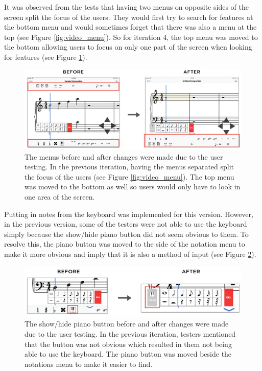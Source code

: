 				It was observed from the tests that having two menus on opposite sides of the screen split the focus of the users. They would first try to search for features at the bottom menu and would sometimes forget that there was also a menu at the top (see Figure \ref{fig:video_menu}). So for iteration 4, the top menu was moved to the bottom allowing users to focus on only one part of the screen when looking for features (see Figure \ref{fig:before-after-menu}). 

				\begin{figure}[h]
					\centering
					\includegraphics[scale=0.31]{figures/before-after-menu}
				    \caption{The menus before and after changes were made due to the user testing. In the previous iteration, having the menus separated split the focus of the users (see Figure \ref{fig:video_menu}). The top menu was moved to the bottom as well so users would only have to look in one area of the screen.}
				    \label{fig:before-after-menu}
				\end{figure}

				Putting in notes from the keyboard was implemented for this version. However, in the previous version, some of the testers were not able to use the keyboard simply because the show/hide piano button did not seem obvious to them. To resolve this, the piano button was moved to the side of the notation menu to make it more obvious and imply that it is also a method of input (see Figure \ref{fig:before-after-pianobtn}). 

				\begin{figure}[h]
					\centering
					\includegraphics[scale=0.31]{figures/before-after-pianobtn.png}
				    \caption{The show/hide piano button before and after changes were made due to the user testing. In the previous iteration, testers mentioned that the button was not obvious which resulted in them not being able to use the keyboard. The piano button was moved beside the notations menu to make it easier to find.}
				    \label{fig:before-after-pianobtn}
				\end{figure}

